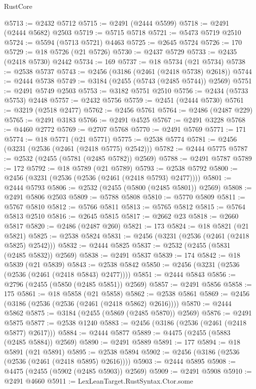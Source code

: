 \begin{lexlean}{RustCore}
\begin{coremodule}
@5713 := @2432 @5712
@5715 := @2491 (@2444 @5599)
@5718 := @2491 (@2444 @5682) @2503
@5719 := @5715 @5718
@5721 := @5473 @5719 @2510
@5724 := @5594 (@5713 @5721) @4463
@5725 := @2645 @5724
@5726 := 170
@5729 := @18 @5726 (@21 @5726)
@5730 := @2437 @5729
@5733 := @2435 (@2418 @5730) @2442
@5734 := 169
@5737 := @18 @5734 (@21 @5734)
@5738 := @2538 @5737
@5743 := @2456 (@3186 (@2461 (@2418 @5738) @2618))
@5744 := @2444 @5738
@5749 := @3184 (@2455 (@5743 (@2485 @5744)) @2569)
@5751 := @2491 @5749 @2503
@5753 := @3182 @5751 @2510
@5756 := @2434 (@5733 @5753) @2448
@5757 := @2432 @5756
@5759 := @2451 (@2444 @5730)
@5761 := @3219 (@2518 @2477)
@5762 := @2456 @5761
@5764 := @2486 (@2487 @229)
@5765 := @2491 @3183
@5766 := @2491 @4525
@5767 := @2491 @3228
@5768 := @4460 @2772
@5769 := @2707 @5768
@5770 := @2491 @5769
@5771 := 171
@5774 := @18 @5771 (@21 @5771)
@5775 := @2538 @5774
@5781 := @2456 (@3231 (@2536 (@2461 (@2418 @5775) @2542)))
@5782 := @2444 @5775
@5787 := @2532 (@2455 (@5781 (@2485 @5782)) @2569)
@5788 := @2491 @5787
@5789 := 172
@5792 := @18 @5789 (@21 @5789)
@5793 := @2538 @5792
@5800 := @2456 (@3231 (@2536 (@2536 (@2461 (@2418 @5793) @2477))))
@5801 := @2444 @5793
@5806 := @2532 (@2455 (@5800 (@2485 @5801)) @2569)
@5808 := @2491 @5806 @2503
@5809 := @5788 @5808
@5810 := @5770 @5809
@5811 := @5767 @5810
@5812 := @5766 @5811
@5813 := @5765 @5812
@5815 := @5764 @5813 @2510
@5816 := @2645 @5815
@5817 := @2662 @23
@5818 := @2660 @5817
@5820 := @2486 (@2487 @260)
@5821 := 173
@5824 := @18 @5821 (@21 @5821)
@5825 := @2538 @5824
@5831 := @2456 (@3231 (@2536 (@2461 (@2418 @5825) @2542)))
@5832 := @2444 @5825
@5837 := @2532 (@2455 (@5831 (@2485 @5832)) @2569)
@5838 := @2491 @5837
@5839 := 174
@5842 := @18 @5839 (@21 @5839)
@5843 := @2538 @5842
@5850 := @2456 (@3231 (@2536 (@2536 (@2461 (@2418 @5843) @2477))))
@5851 := @2444 @5843
@5856 := @2796 (@2455 (@5850 (@2485 @5851)) @2569)
@5857 := @2491 @5856
@5858 := 175
@5861 := @18 @5858 (@21 @5858)
@5862 := @2538 @5861
@5869 := @2456 (@3186 (@2536 (@2536 (@2461 (@2418 @5862) @2616))))
@5870 := @2444 @5862
@5875 := @3184 (@2455 (@5869 (@2485 @5870)) @2569)
@5876 := @2491 @5875
@5877 := @2538 @1240
@5883 := @2456 (@3186 (@2536 (@2461 (@2418 @5877) @2617)))
@5884 := @2444 @5877
@5889 := @4475 (@2455 (@5883 (@2485 @5884)) @2569)
@5890 := @2491 @5889
@5891 := 177
@5894 := @18 @5891 (@21 @5891)
@5895 := @2538 @5894
@5902 := @2456 (@3186 (@2536 (@2536 (@2461 (@2418 @5895) @2616))))
@5903 := @2444 @5895
@5908 := @4475 (@2455 (@5902 (@2485 @5903)) @2569)
@5909 := @2491 @5908
@5910 := @2491 @4660
@5911 := LexLeanTarget.RustSyntax.Ctor.some

\end{coremodule}
\end{lexlean}
